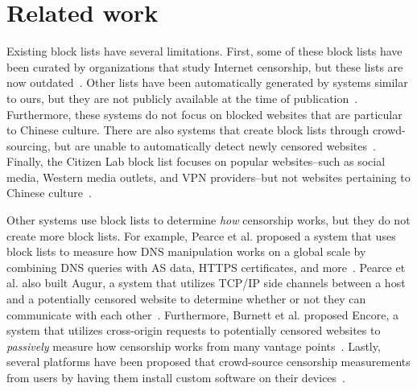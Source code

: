 
\section{Related work}
Existing block lists have several limitations. First, some of these
block lists have been curated by organizations that study Internet
censorship, but these lists are now
outdated~\cite{chinadigitaltimes,oni}. Other lists have been
automatically generated by systems similar to ours, but they are not
publicly available at the time of
publication~\cite{sfakianakis2011censmon, darer2017filteredweb,
darer2018automated}. Furthermore, these systems do not focus on
blocked websites that are particular to Chinese culture. There are
also systems that create block lists through crowd-sourcing, but are
unable to automatically detect newly censored websites~\cite{herdict,
greatfire}. Finally, the Citizen Lab block list focuses on popular
websites--such as social media, Western media outlets, and VPN
providers--but not websites pertaining to Chinese
culture~\cite{citizenlab:block}.

Other systems use block lists to determine \textit{how} censorship
works, but they do not create more block lists. For example, Pearce
et al. proposed a system that uses block lists to measure how DNS
manipulation works on a global scale by combining DNS queries with AS
data, HTTPS certificates, and more~\cite{pearce2017global}. Pearce
et al. also built Augur, a system that utilizes TCP/IP side channels
between a host and a potentially censored website to determine whether
or not they can communicate with each
other~\cite{pearce2017augur}. Furthermore, Burnett et al. proposed
Encore, a system that utilizes cross-origin requests to potentially
censored websites to \textit{passively} measure how censorship works
from many vantage points~\cite{burnett:encore}. Lastly, several
platforms have been proposed that crowd-source censorship measurements
from users by having them install custom software on their
devices~\cite{razaghpanah2016exploring, ooni:about, iclab}.
